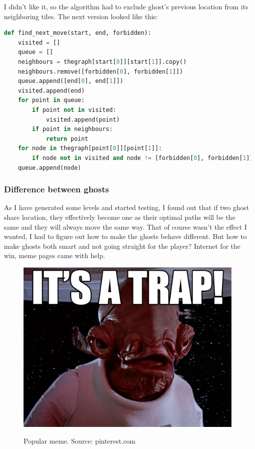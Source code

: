 \documentclass[11pt,a4paper]{report}
\newenvironment{img}{
	\begin{center}
		\begin{figure}[H]
			\begin{center}
			
}{
	\end{center}
		\end{figure}
			\end{center}
}
\begin{document}
					I didn't like it, so the algorithm had to exclude ghost's previous location from its neighboring tiles. The next version looked like this:
					\begin{lstlisting}[language=Python]
def find_next_move(start, end, forbidden):
    visited = []
    queue = []
    neighbours = thegraph[start[0]][start[1]].copy()
    neighbours.remove([forbidden[0], forbidden[1]])
    queue.append([end[0], end[1]])
    visited.append(end)
    for point in queue:
        if point not in visited:
            visited.append(point)
        if point in neighbours:
            return point
    for node in thegraph[point[0]][point[1]]:
        if node not in visited and node != [forbidden[0], forbidden[1]]:
    queue.append(node)
					\end{lstlisting}
				\subsubsection{Difference between ghosts}
					As I have generated some levels and started testing, I found out that if two ghost share location, they effectively become one as their optimal paths will be the same and they will always move the same way. That of course wasn't the effect I wanted, I had to figure out how to make the ghosts behave different. But how to make ghosts both smart and not going straight for the player? Internet for the win, meme pages came with help.
					\begin{img}
						\includegraphics[width=350pt]{images/trap}\\
						\caption{Popular meme. Source: pinterest.com}
						\label{trap}
					\end{img}
\end{document}

